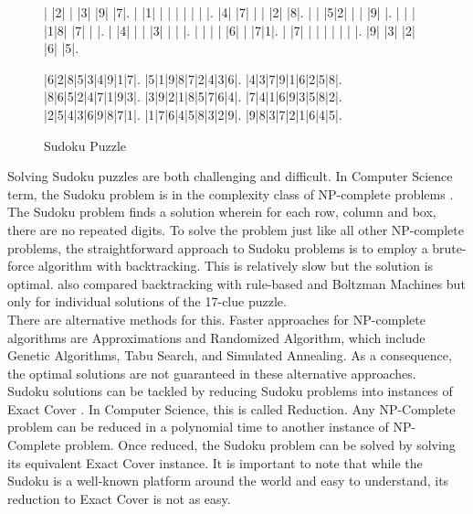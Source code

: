 \documentclass[a4paper,oneside,11pt]{report}
\begin{document}
\begin{figure}[H]
\begin{center}
\begin{sudoku-block}
| |2| | |3| |9| |7|.
| |1| | | | | | | |.
|4| |7| | | |2| |8|.
| | |5|2| | | |9| |.
| | | |1|8| |7| | |.
| |4| | | |3| | | |.
| | | | |6| | |7|1|.
| |7| | | | | | | |.
|9| |3| |2| |6| |5|.
\end{sudoku-block}
\hspace{2cm}
\begin{sudoku-block}
|6|2|8|5|3|4|9|1|7|.
|5|1|9|8|7|2|4|3|6|.
|4|3|7|9|1|6|2|5|8|.
|8|6|5|2|4|7|1|9|3|.
|3|9|2|1|8|5|7|6|4|.
|7|4|1|6|9|3|5|8|2|.
|2|5|4|3|6|9|8|7|1|.
|1|7|6|4|5|8|3|2|9|.
|9|8|3|7|2|1|6|4|5|.
\end{sudoku-block}
\end{center}
\caption{Sudoku Puzzle}
\end{figure}

Solving Sudoku puzzles are both challenging and difficult. In Computer Science term, the Sudoku problem is in the complexity class of NP-complete problems \cite{Yato}. The Sudoku problem finds a solution wherein for each row, column and box, there are no repeated digits. To solve the problem just like all other NP-complete problems, the straightforward approach to Sudoku problems is to employ a brute-force algorithm with backtracking. This is relatively slow but the solution is optimal. \cite{Berggren} also compared backtracking with rule-based and Boltzman Machines but only for individual solutions of the 17-clue puzzle.\\

There are alternative methods for this. Faster approaches for NP-complete algorithms are Approximations and Randomized Algorithm, which include Genetic Algorithms, Tabu Search, and Simulated Annealing. As a consequence, the optimal solutions are not guaranteed in these alternative approaches.\\

Sudoku solutions can be tackled by reducing Sudoku problems into instances of Exact Cover \cite{Harrysson}. In Computer Science, this is called Reduction. Any NP-Complete problem can be reduced in a polynomial time to another instance of NP-Complete problem. Once reduced, the Sudoku problem can be solved by solving its equivalent Exact Cover instance. It is important to note that while the Sudoku is a well-known platform around the world and easy to understand, its reduction to Exact Cover is not as easy.\\
\end{document}

